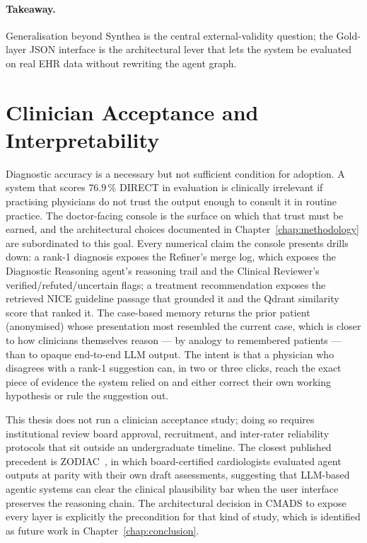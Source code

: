 \paragraph{Takeaway.} Generalisation beyond Synthea is the central
external-validity question; the Gold-layer JSON interface is the
architectural lever that lets the system be evaluated on real EHR
data without rewriting the agent graph.

\section{Clinician Acceptance and Interpretability}
\label{sec:discussion_acceptance}

Diagnostic accuracy is a necessary but not sufficient condition for
adoption. A system that scores $76.9\,\%$ DIRECT in evaluation is
clinically irrelevant if practising physicians do not trust the
output enough to consult it in routine practice. The doctor-facing
console is the surface on which that trust must be earned, and the
architectural choices documented in
Chapter~\ref{chap:methodology} are subordinated to this goal. Every
numerical claim the console presents drills down: a rank-1 diagnosis
exposes the Refiner's merge log, which exposes the Diagnostic
Reasoning agent's reasoning trail and the Clinical Reviewer's
verified/refuted/uncertain flags; a treatment recommendation exposes
the retrieved NICE guideline passage that grounded it and the
Qdrant similarity score that ranked it. The case-based memory
returns the prior patient (anonymised) whose presentation most
resembled the current case, which is closer to how clinicians
themselves reason --- by analogy to remembered patients --- than to
opaque end-to-end LLM output. The intent is that a physician who
disagrees with a rank-1 suggestion can, in two or three clicks,
reach the exact piece of evidence the system relied on and either
correct their own working hypothesis or rule the suggestion out.

This thesis does not run a clinician acceptance study; doing so
requires institutional review board approval, recruitment, and
inter-rater reliability protocols that sit outside an undergraduate
timeline. The closest published precedent is
ZODIAC~\cite{Zhou2024ZODIAC}, in which board-certified cardiologists
evaluated agent outputs at parity with their own draft assessments,
suggesting that LLM-based agentic systems can clear the clinical
plausibility bar when the user interface preserves the reasoning
chain. The architectural decision in CMADS to expose every layer is
explicitly the precondition for that kind of study, which is
identified as future work in Chapter~\ref{chap:conclusion}.

